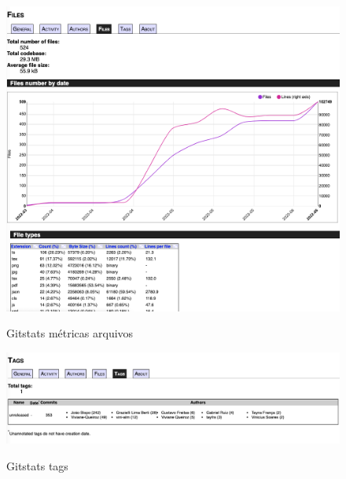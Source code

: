 \begin{figure}[htb]
	\centering
	\caption{\label{fig_arq_virado}Gitstats métricas arquivos}
	\includegraphics[width=1.00\textwidth]{anexos/metricas8.png}
	\label{metricas-8}
\end{figure}

\begin{figure}[htb]
	\centering
	\caption{\label{fig_arq_virado}Gitstats tags}
	\includegraphics[width=1.00\textwidth]{anexos/metricas9.png}
	\label{metricas-9}
\end{figure}